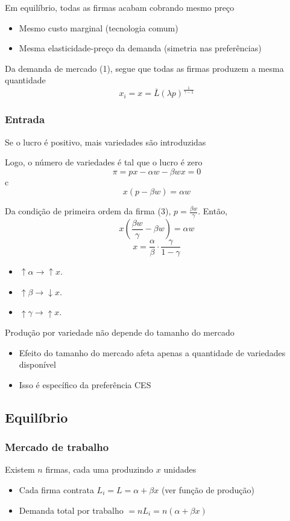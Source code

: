 \documentclass[a4paper,12pt]{article}[abntex2]
\begin{document}
Em equilíbrio, todas as firmas acabam cobrando mesmo preço
\begin{itemize}
    \item Mesmo custo marginal (tecnologia comum)
    \item Mesma elasticidade-preço da demanda (simetria nas preferências)
\end{itemize}

Da demanda de mercado (1), segue que todas as firmas produzem a mesma quantidade
\[
x_i = x = \bar{L} (\lambda p)^{\frac{1}{\gamma - 1}}
\]

\subsubsection{\textbf{Entrada}}
Se o lucro é positivo, mais variedades são introduzidas

Logo, o número de variedades é tal que o lucro é zero
\[
\pi = px - \alpha w - \beta w x = 0
\]c
\[
x(p - \beta w) = \alpha w
\]

Da condição de primeira ordem da firma (3), \(p = \frac{\beta w}{\gamma}\). Então,
\[
x \left( \frac{\beta w}{\gamma} - \beta w \right) = \alpha w
\]
\[
x = \frac{\alpha}{\beta} \cdot \frac{\gamma}{1 - \gamma}
\]\begin{itemize}
    \item \(\uparrow\alpha\rightarrow\uparrow x\). 
    \item \(\uparrow\beta\rightarrow\downarrow x\).
    \item \(\uparrow\gamma\rightarrow\uparrow x\). 
\end{itemize}

Produção por variedade não depende do tamanho do mercado
\begin{itemize}
    \item Efeito do tamanho do mercado afeta apenas a quantidade de variedades disponível
    \item Isso é específico da preferência CES
\end{itemize}

\subsection{\textbf{Equilíbrio}}
\subsubsection{\textbf{Mercado de trabalho}}
Existem \(n\) firmas, cada uma produzindo \(x\) unidades
\begin{itemize}
    \item Cada firma contrata \(L_i = L = \alpha + \beta x\) (ver função de produção)
    \item Demanda total por trabalho \(= nL_i = n(\alpha + \beta x)\)
\end{itemize}
\end{document}
